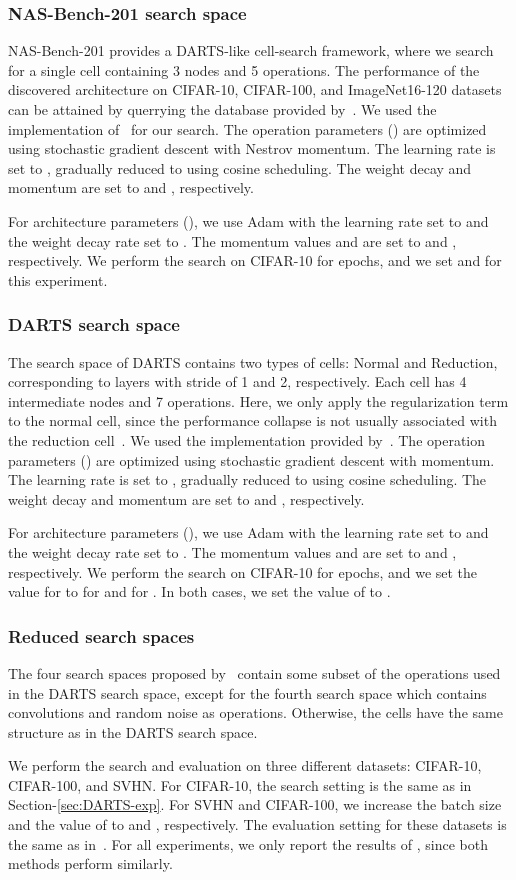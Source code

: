 \documentclass{article} \usepackage{fancyhdr, iclr2023_conference, times}
\begin{document}
\subsubsection{NAS-Bench-201 search space}
 NAS-Bench-201 provides a DARTS-like cell-search framework, where we search for a single cell containing 3 nodes and 5 operations. The performance of the discovered architecture on CIFAR-10, CIFAR-100, and ImageNet16-120 datasets can be attained by querrying the database provided by~\citep{DBLP:conf/iclr/Dong020}. We used the implementation of~\citep{DBLP:conf/iclr/Dong020} for our search. The operation parameters () are optimized using stochastic gradient descent with Nestrov momentum. The learning rate is set to , gradually reduced to  using cosine scheduling. The weight decay and momentum are set to  and , respectively.  
 \par For architecture parameters (), we use Adam with the learning rate set to  and the weight decay rate set to . The momentum values  and  are set to  and , respectively. We perform the search on CIFAR-10 for  epochs, and we set  and  for this experiment. 
 \subsubsection{DARTS search space}
 The search space of DARTS contains two types of cells: Normal and Reduction, corresponding to layers with stride of 1 and 2, respectively. Each cell has 4 intermediate nodes and 7 operations. Here, we only apply the regularization term to the normal cell, since the performance collapse is not usually associated with the reduction cell~\citep{DBLP:conf/iclr/ZelaESMBH20}. We used the implementation provided by~\citep{DBLP:conf/iclr/WangCCTH21, DBLP:conf/icml/ChenH20}. The operation parameters () are optimized using stochastic gradient descent with momentum. The learning rate is set to , gradually reduced to  using cosine scheduling. The weight decay and momentum are set to  and , respectively.  
 \par For architecture parameters (), we use Adam with the learning rate set to  and the weight decay rate set to . The momentum values  and  are set to  and , respectively. We perform the search on CIFAR-10 for  epochs, and we set the value for  to  for  and  for . In both cases, we set the value of  to .
 \subsubsection{Reduced search spaces}
 The four search spaces proposed by~\citep{DBLP:conf/iclr/ZelaESMBH20} contain some subset of the operations used in the DARTS search space, except for the fourth search space which contains convolutions and random noise as operations. Otherwise, the cells have the same structure as in the DARTS search space.
\par We perform the search and evaluation on three different datasets: CIFAR-10, CIFAR-100, and SVHN. For CIFAR-10, the search setting is the same as in Section-\ref{sec:DARTS-exp}. For SVHN and CIFAR-100, we increase the batch size and the value of  to  and , respectively. The evaluation setting for these datasets is the same as in~\citep{DBLP:conf/iclr/ZelaESMBH20}. For all experiments, we only report the results of , since both methods perform similarly.
\end{document}
